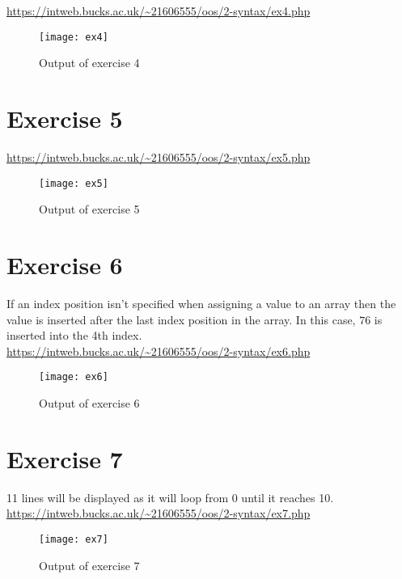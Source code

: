 \url{https://intweb.bucks.ac.uk/~21606555/oos/2-syntax/ex4.php}
\captionsetup{type=figure}


\begin{figure}[H]
  \caption{Output of exercise 4}
  \centering
  \texttt{[image: ex4]}
\end{figure}

\clearpage
\section{Exercise 5}

\url{https://intweb.bucks.ac.uk/~21606555/oos/2-syntax/ex5.php}
\captionsetup{type=figure}


\begin{figure}[H]
  \caption{Output of exercise 5}
  \centering
  \texttt{[image: ex5]}
\end{figure}

\section{Exercise 6}

If an index position isn't specified when assigning a value to an array then the value is inserted after the last index position in the array. In this case, $76$ is inserted into the 4th index.\\

\url{https://intweb.bucks.ac.uk/~21606555/oos/2-syntax/ex6.php}
\captionsetup{type=figure}


\begin{figure}[H]
  \caption{Output of exercise 6}
  \centering
  \texttt{[image: ex6]}
\end{figure}

\section{Exercise 7}

11 lines will be displayed as it will loop from 0 until it reaches 10.\\

\url{https://intweb.bucks.ac.uk/~21606555/oos/2-syntax/ex7.php}
\captionsetup{type=figure}


\begin{figure}[H]
  \caption{Output of exercise 7}
  \centering
  \texttt{[image: ex7]}
\end{figure}

